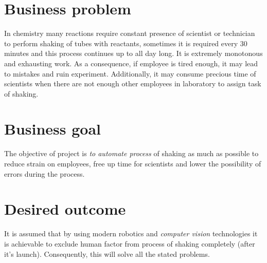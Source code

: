 \section{Business problem}

In chemistry many reactions require constant presence of scientist or technician to perform shaking of tubes with reactants, sometimes it is required every 30 minutes and this process continues up to all day long. It is extremely monotonous and exhausting work. As a consequence, if employee is tired enough, it may lead to mistakes and ruin experiment. Additionally, it may consume precious time of scientists when there are not enough other employees in laboratory to assign task of shaking.


\section{Business goal}

The objective of project is \textit{to automate process} of shaking as much as possible to reduce strain on employees, free up time for scientists and lower the possibility of errors during the process.  


\section{Desired outcome}

It is assumed that by using modern robotics and \textit{computer vision} technologies it is achievable to exclude human factor from process of shaking completely (after it's launch). Consequently, this will solve all the stated problems.
